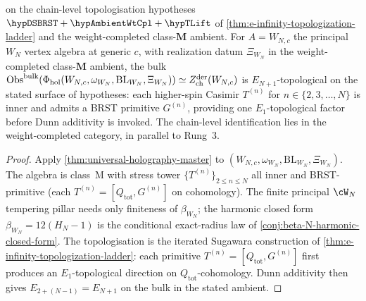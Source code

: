 \begin{corollary}
\ClaimStatusConditional{} on the chain-level topologisation
hypotheses \(\hypDSBRST+\hypAmbientWtCpl+\hypTLift\) of
\cref{thm:e-infinity-topologization-ladder} and the weight-completed
class-$\mathbf M$ ambient.
For \(A=W_{N,c}\) the principal \(W_N\) vertex algebra at generic
\(c\), with realization datum \(\Xi_{W_N}\) in the
weight-completed class-\(\mathbf M\) ambient, the bulk
$\mathrm{Obs}^{\mathrm{bulk}}(\Phi_{\mathrm{hol}}(W_{N,c},\omega_{W_N},
\mathrm{BL}_{W_N},\Xi_{W_N}))
\simeq Z^{\mathrm{der}}_{\mathrm{ch}}(W_{N, c})$ is
$E_{N+1}$-topological on the stated surface of hypotheses:
each higher-spin Casimir $T^{(n)}$ for $n \in \{2, 3, \ldots, N\}$
is inner and admits a BRST primitive $G^{(n)}$, providing one
$E_{1}$-topological factor before Dunn additivity is invoked. The
chain-level identification lies in the weight-completed category,
in parallel to Rung~3.
\end{corollary}

\begin{proof}
Apply \cref{thm:universal-holography-master} to
\((W_{N,c},\omega_{W_N},\mathrm{BL}_{W_N},\Xi_{W_N})\).
The algebra is class~M with stress tower
$\{T^{(n)}\}_{2 \le n \le N}$ all inner and BRST-primitive (each
$T^{(n)} = [Q_{\mathrm{tot}}, G^{(n)}]$ on cohomology). The finite
principal $\cW_N$ tempering pillar needs only finiteness of
$\beta_{W_N}$; the harmonic closed form
$\beta_{W_N} = 12 (H_N - 1)$ is the conditional exact-radius law of
\cref{conj:beta-N-harmonic-closed-form}. The
topologisation is the iterated Sugawara construction of
\cref{thm:e-infinity-topologization-ladder}: each primitive
$T^{(n)}=[Q_{\mathrm{tot}},G^{(n)}]$ first produces an
$E_{1}$-topological direction on $Q_{\mathrm{tot}}$-cohomology.
Dunn additivity then gives
$E_{2 + (N-1)} = E_{N+1}$ on the bulk in the stated ambient.
\end{proof}

